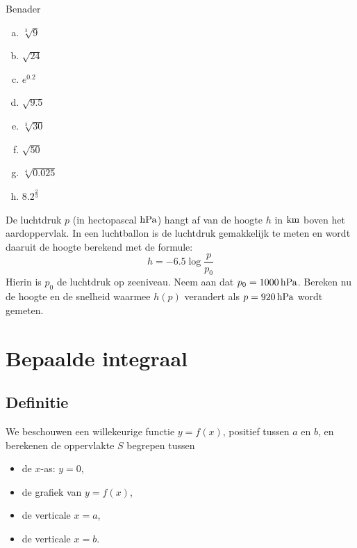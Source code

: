 \documentclass[a4paper,12pt]{article}
\begin{document}
\begin{oefening}
Benader
\begin{multicols}{3}
\begin{enumerate}[(a)]
  \itemsep.5em
  \item $\displaystyle \sqrt[3]{9}$
  \item $\displaystyle \sqrt{24}$
  \item $\displaystyle e^{0.2}$
  \item $\displaystyle \sqrt{9.5}$
  \item $\displaystyle \sqrt[3]{30}$
  \item $\displaystyle \sqrt{50}$
  \item $\displaystyle \sqrt[4]{0.025}$
  \item $\displaystyle 8.2^\frac{2}{3}$
\end{enumerate}
\end{multicols}
\end{oefening}

\begin{oefening} %
De luchtdruk $p$ (in hectopascal $\hPa$) hangt af van de hoogte $h$ in $\km$ boven het aardoppervlak. In een luchtballon is de luchtdruk gemakkelijk te meten en wordt daaruit de hoogte berekend met de formule:
$$h = -6.5 \log \frac{p}{p_0}$$
Hierin is $p_0$ de luchtdruk op zeeniveau. Neem aan dat $p_0 = 1000 \hPa$.
Bereken nu de hoogte en de snelheid waarmee $h(p)$ verandert als $p = 920 \hPa$ wordt gemeten. 
\end{oefening}

\pagebreak
\section{Bepaalde integraal}

\subsection{Definitie}

We beschouwen een willekeurige functie $y=f(x)$, positief tussen $a$ en $b$, en berekenen de oppervlakte $S$ begrepen tussen
\begin{itemize}
  \item de $x$-as: $y=0$,
  \item de grafiek van $y=f(x)$,
  \item de verticale $x=a$,
  \item de verticale $x=b$.
\end{itemize}
\end{document}
